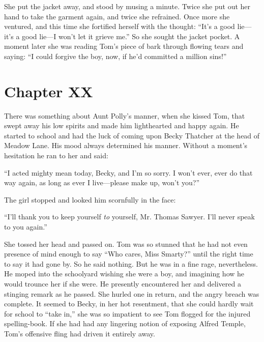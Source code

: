 \documentclass{book}
\begin{document}
She put the jacket away, and stood by musing a minute. Twice she put out her hand to take the garment again, and twice she refrained. Once more she ventured, and this time she fortified herself with the thought: “It’s a good lie—it’s a good lie—I won’t let it grieve me.” So she sought the jacket pocket. A moment later she was reading Tom’s piece of bark through flowing tears and saying: “I could forgive the boy, now, if he’d committed a million sins!”

\chapter*{Chapter XX}

There was something about Aunt Polly’s manner, when she kissed Tom, that swept away his low spirits and made him lighthearted and happy again. He started to school and had the luck of coming upon Becky Thatcher at the head of Meadow Lane. His mood always determined his manner. Without a moment’s hesitation he ran to her and said:

“I acted mighty mean today, Becky, and I’m so sorry. I won’t ever, ever do that way again, as long as ever I live—please make up, won’t you?”

The girl stopped and looked him scornfully in the face:

“I’ll thank you to keep yourself \emph{to} yourself, Mr. Thomas Sawyer. I’ll never speak to you again.”

She tossed her head and passed on. Tom was so stunned that he had not even presence of mind enough to say “Who cares, Miss Smarty?” until the right time to say it had gone by. So he said nothing. But he was in a fine rage, nevertheless. He moped into the schoolyard wishing she were a boy, and imagining how he would trounce her if she were. He presently encountered her and delivered a stinging remark as he passed. She hurled one in return, and the angry breach was complete. It seemed to Becky, in her hot resentment, that she could hardly wait for school to “take in,” she was so impatient to see Tom flogged for the injured spelling-book. If she had had any lingering notion of exposing Alfred Temple, Tom’s offensive fling had driven it entirely away.
\end{document}
